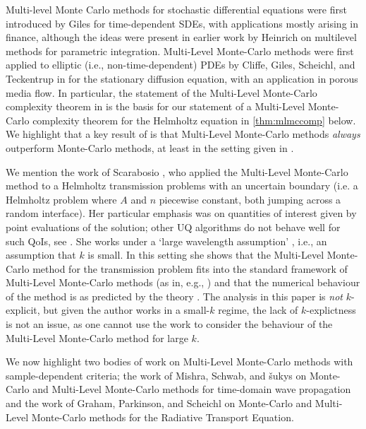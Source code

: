 Multi-level Monte Carlo methods for stochastic differential equations were first introduced by Giles \cite{Gi:08} for time-dependent SDEs, with applications mostly arising in finance, although the ideas were present in earlier work by Heinrich \cite{He:98,He:01} on multilevel methods for parametric integration. Multi-Level Monte-Carlo methods were first applied to elliptic (i.e., non-time-dependent) PDEs by Cliffe, Giles, Scheichl, and Teckentrup in \cite{ClGiScTe:11} for the stationary diffusion equation, with an application in porous media flow. In particular, the statement of the Multi-Level Monte-Carlo complexity theorem in \cite[Theorem 1]{ClGiScTe:11} is the basis for our statement of a Multi-Level Monte-Carlo complexity theorem for the Helmholtz equation in \cref{thm:mlmccomp} below. We highlight that a key result of \cite[Theorem 1]{ClGiScTe:11} is that Multi-Level Monte-Carlo methods \emph{always} outperform Monte-Carlo methods, at least in the setting given in \cite{ClGiScTe:11}.

We mention the work of Scarabosio \cite{Sc:17}, who applied the Multi-Level Monte-Carlo method to a Helmholtz transmission problems with an uncertain boundary (i.e. a Helmholtz problem where $A$ and $n$ piecewise constant, both jumping across a random interface). Her particular emphasis was on quantities of interest given by point evaluations of the solution; other UQ algorithms do not behave well for such QoIs, see \cite[Section 3.3]{Sc:17}. She works under a `large wavelength assumption' \cite[Assumption 3.1]{Sc:17}, i.e., an assumption that $k$ is small.  In this setting she shows that the Multi-Level Monte-Carlo method for the transmission problem fits into the standard framework of Multi-Level Monte-Carlo methods \cite[Proposition 4.2]{Sc:17} (as in, e.g., \cite{ClGiScTe:11,Gi:15}) and that the numerical behaviour of the method is as predicted by the theory \cite[Section 6]{Sc:17}. The analysis in this paper is \emph{not} $k$-explicit, but given the author works in a small-$k$ regime, the lack of $k$-explictness is not an issue, as one cannot use the work to consider the behaviour of the Multi-Level Monte-Carlo method for large $k.$

We now highlight two bodies of work on Multi-Level Monte-Carlo methods with sample-dependent criteria; the work of Mishra, Schwab, and \v{s}ukys on Monte-Carlo and Multi-Level Monte-Carlo methods for time-domain wave propagation and the work of Graham, Parkinson, and Scheichl on Monte-Carlo and Multi-Level Monte-Carlo methods for the Radiative Transport Equation.


